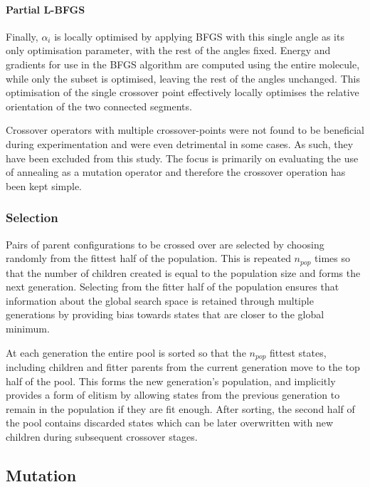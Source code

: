 \documentclass{article}
\begin{document}
\paragraph{Partial L-BFGS}

Finally, $\alpha_i$ is locally optimised by applying BFGS with this single angle
as its only optimisation parameter, with the rest of the angles fixed. Energy
and gradients for use in the BFGS algorithm are computed using the entire
molecule, while only the subset is optimised, leaving the rest of the angles
unchanged. This optimisation of the single crossover point effectively locally
optimises the relative orientation of the two connected segments.

Crossover operators with multiple crossover-points were not found to be
beneficial during experimentation and were even detrimental in some cases. As
such, they have been excluded from this study. The focus is primarily on
evaluating the use of annealing as a mutation operator and therefore the
crossover operation has been kept simple.

\subsubsection{Selection}

Pairs of parent configurations to be crossed over are selected by choosing
randomly from the fittest half of the population. This is repeated $n_{pop}$
times so that the number of children created is equal to the population size and
forms the next generation. Selecting from the fitter half of the population
ensures that information about the global search space is retained through
multiple generations by providing bias towards states that are closer to the
global minimum.

At each generation the entire pool is sorted so that the $n_{pop}$ fittest
states, including children and fitter parents from the current generation move
to the top half of the pool. This forms the new generation's population, and
implicitly provides a form of elitism by allowing states from the previous
generation to remain in the population if they are fit enough. After sorting,
the second half of the pool contains discarded states which can be later
overwritten with new children during subsequent crossover stages.

\subsection{Mutation}
\end{document}

